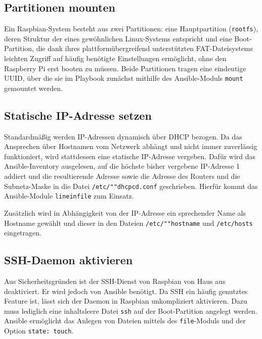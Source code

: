 \subsection{Partitionen mounten}\label{subsec:partitionen-mounten}

Ein Raspbian-System besteht aus zwei Partitionen: eine Hauptpartition (\texttt{rootfs}), deren Struktur der eines gewöhnlichen Linux-Systems entspricht und eine Boot-Partition, die dank ihres plattformübergreifend unterstützten FAT-Dateisystems leichten Zugriff auf häufig benötigte Einstellungen ermöglicht, ohne den Raspberry Pi erst booten zu müssen.
Beide Partitionen tragen eine eindeutige UUID, über die sie im Playbook zunächst mithilfe des Ansible-Moduls \texttt{mount} gemountet werden.

\subsection{Statische IP-Adresse setzen}\label{subsec:statische-ip-adresse-setzen}

Standardmäßig werden IP-Adressen dynamisch über DHCP bezogen.
Da das Ansprechen über Hostnamen vom Netzwerk abhängt und nicht immer zuverlässig funktioniert, wird stattdessen eine statische IP-Adresse vergeben.
Dafür wird das Ansible-Inventory ausgelesen, auf die höchste bisher vergebene IP-Adresse 1 addiert und die resultierende Adresse sowie die Adresse des Routers und die Subnetz-Maske in die Datei \texttt{/etc/""dhcpcd.conf} geschrieben.
Hierfür kommt das Ansible-Module \texttt{lineinfile} zum Einsatz.

Zusätzlich wird in Abhängigkeit von der IP-Adresse ein sprechender Name als Hostname gewählt und dieser in den Dateien \texttt{/etc/""hostname} und \texttt{/etc/hosts} eingetragen.

\subsection{SSH-Daemon aktivieren}\label{subsec:ssh-daemon-aktivieren}

Aus Sicherheitsgründen ist der SSH-Dienst von Raspbian von Haus aus deaktiviert.
Er wird jedoch von Ansible benötigt.
Da SSH ein häufig genutztes Feature ist, lässt sich der Daemon in Raspbian unkompliziert aktivieren.
Dazu muss lediglich eine inhaltsleere Datei \texttt{ssh} auf der Boot-Partition angelegt werden.
Ansible ermöglicht das Anlegen von Dateien mittels des \texttt{file}-Moduls und der Option \texttt{state: touch}.

